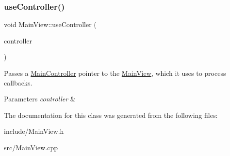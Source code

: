 \subsubsection{\texorpdfstring{use\+Controller()}{useController()}}
{\footnotesize\ttfamily void Main\+View\+::use\+Controller (\begin{DoxyParamCaption}\item[{\hyperlink{classMainController}{Main\+Controller} $\ast$}]{controller }\end{DoxyParamCaption})}



Passes a \hyperlink{classMainController}{Main\+Controller} pointer to the \hyperlink{classMainView}{Main\+View}, which it uses to process callbacks. 


\begin{DoxyParams}{Parameters}
{\em controller} & \\
\hline
\end{DoxyParams}


The documentation for this class was generated from the following files\+:\begin{DoxyCompactItemize}
\item 
include/Main\+View.\+h\item 
src/Main\+View.\+cpp\end{DoxyCompactItemize}
